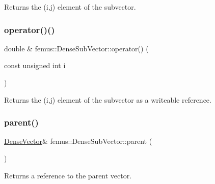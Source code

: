 \begin{DoxyReturn}{Returns}
the {\ttfamily }(i,j) element of the subvector. 
\end{DoxyReturn}
\mbox{\label{classfemus_1_1_dense_sub_vector_a815b31cc0fc273a1c82835c0e9fdf40b}} 
\subsubsection{\texorpdfstring{operator()()}{operator()()}\hspace{0.1cm}{\footnotesize\ttfamily [2/2]}}
{\footnotesize\ttfamily double \& femus\+::\+Dense\+Sub\+Vector\+::operator() (\begin{DoxyParamCaption}\item[{const unsigned int}]{i }\end{DoxyParamCaption})\hspace{0.3cm}{\ttfamily [inline]}}

\begin{DoxyReturn}{Returns}
the {\ttfamily }(i,j) element of the subvector as a writeable reference. 
\end{DoxyReturn}
\mbox{\label{classfemus_1_1_dense_sub_vector_a0daed4a44c5471622d5b6600acef2298}} 
\subsubsection{\texorpdfstring{parent()}{parent()}}
{\footnotesize\ttfamily \mbox{\hyperlink{classfemus_1_1_dense_vector}{Dense\+Vector}}\& femus\+::\+Dense\+Sub\+Vector\+::parent (\begin{DoxyParamCaption}{ }\end{DoxyParamCaption})\hspace{0.3cm}{\ttfamily [inline]}}

\begin{DoxyReturn}{Returns}
a reference to the parent vector. 
\end{DoxyReturn}
\mbox{\label{classfemus_1_1_dense_sub_vector_afdaa52b0ba46efba781c7d7f0fe6e950}} 

